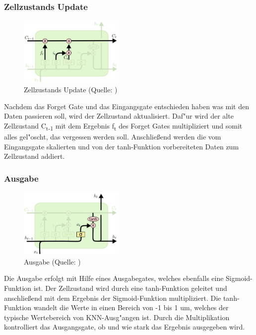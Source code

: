 {\subsubsection{Zellzustands Update}
\begin{figure}
  \vspace{-30pt}
  \begin{center}
    \includegraphics[width=0.45\textwidth]{pictures/LSTM3-focus-C_cut.png}
  \end{center}
  \vspace{-20pt}
  \caption[LSTM: Zellzustands Update]{Zellzustands Update (Quelle: \cite{OlahImg})}
\vspace{-10pt}
\end{figure}
Nachdem das Forget Gate und das Eingangsgate entschieden haben was mit den Daten passieren soll, wird der Zellzustand aktualisiert. Daf"ur wird der alte Zellzustand C\textsubscript{t-1} mit dem Ergebnis f\textsubscript{t} des Forget Gates multipliziert und somit alles gel"oscht, das vergessen werden soll. Anschlie{\ss}end werden die vom Eingangsgate skalierten und von der tanh-Funktion vorbereiteten Daten zum Zellzustand addiert.

\subsubsection{Ausgabe}
\begin{figure}
  \vspace{-30pt}
  \begin{center}
    \includegraphics[width=0.45\textwidth]{pictures/LSTM3-focus-o_cut.png}
  \end{center}
  \vspace{-20pt}
  \caption[LSTM: Ausgabe]{Ausgabe (Quelle: \cite{OlahImg})}
\vspace{-10pt}
\end{figure}
Die Ausgabe erfolgt mit Hilfe eines Ausgabegates, welches ebenfalls eine Sigmoid-Funktion ist. Der Zellzustand wird durch eine tanh-Funktion geleitet und anschlie{\ss}end mit dem Ergebnis der Sigmoid-Funktion multipliziert. Die tanh-Funktion wandelt die Werte in einen Bereich von -1 bis 1 um, welches der typische Wertebereich von KNN-Ausg"angen ist. Durch die Multiplikation kontrolliert das Ausgangsgate, ob und wie stark das Ergebnis ausgegeben wird.

}
